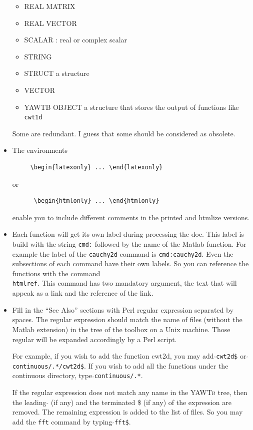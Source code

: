 \documentclass[12pt,a4paper]{article}
\newcommand{\YAWTB}{\textsc{YAWTb}}
\newcommand{\Matlab}{%
\htmladdnormallink{Matlab}{http://www.mathworks.com}}
\newcommand{\libfun}[1]{\texttt{#1}}  %
\begin{document}
\begin{itemize}
\begin{itemize}
  \item REAL MATRIX
  \item REAL VECTOR
  \item SCALAR : real or complex scalar
  \item STRING
  \item STRUCT a \Matlab structure
  \item VECTOR
  \item YAWTB OBJECT a structure that stores the output of functions like
    \libfun{cwt1d}
  \end{itemize}
  Some are redundant.  I guess that some should be considered as obsolete.
\item The environments 
\begin{verbatim}
     \begin{latexonly} ... \end{latexonly}
\end{verbatim} or
\begin{verbatim}
      \begin{htmlonly} ... \end{htmlonly}
\end{verbatim} 
   enable you to include different comments in the printed and htmlize
   versions.
 \item Each function will get its own label during processing the doc.  This
   label is build with the string \texttt{cmd:} followed by the name of the
   Matlab function.  For example the label of the \libfun{cauchy2d} command is
   \texttt{cmd:cauchy2d}.  Even the subsections of each command have their
   own labels.  So you can reference the functions with the command
   \texttt{\\htmlref}.  This command has two mandatory argument, the text
   that will appeak as a link and the reference of the link.
 \item Fill in the ``See Also'' sections with Perl regular expression
   separated by spaces.  The regular expression should match the name of
   files (without the Matlab extension) in the tree of the toolbox on a Unix
   machine.  Those regular will be expanded accordingly by a Perl script.
   
   For example, if you wish to add the function cwt2d, you may add
   \texttt{$\hat{ }$cwt2d\$} or \texttt{$\hat{ }$continuous/.*/cwt2d\$}.  If
   you wish to add all the functions under the continuous directory, type
   \texttt{$\hat{ }$continuous/.*}.

   If the regular expression does not match any name in the \YAWTB{} tree, then
   the leading $\hat{}$ (if any) and the terminated \$ (if any) of the expression
   are removed.  The remaining expression is added to the list of files.  So
   you may add the \texttt{fft} command by typing \texttt{$\hat{}$fft\$}.

\end{itemize}
\end{document}
